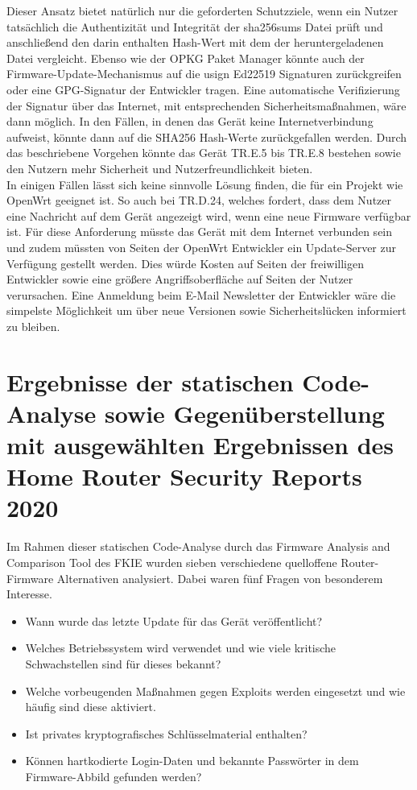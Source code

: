 \documentclass[a4paper]{book}
\begin{document}
\begin{large}
\begin{onehalfspace}
\noindent Dieser Ansatz bietet natürlich nur die geforderten Schutzziele, wenn ein Nutzer tatsächlich die Authentizität und Integrität der sha256sums Datei prüft und anschließend den darin enthalten Hash-Wert mit dem der heruntergeladenen Datei vergleicht. Ebenso wie der OPKG Paket Manager könnte auch der Firmware-Update-Mechanismus auf die usign Ed22519 \mbox Signaturen zurückgreifen oder eine GPG-Signatur der Entwickler tragen. Eine automatische Verifizierung der Signatur über das Internet, mit entsprechenden Sicherheitsmaßnahmen, wäre dann möglich. In den Fällen, in denen das Gerät keine Internetverbindung aufweist, könnte dann auf die SHA256 Hash-Werte zurückgefallen werden. Durch das beschriebene Vorgehen könnte das Gerät TR.E.5 bis TR.E.8 bestehen sowie den Nutzern mehr Sicherheit und Nutzerfreundlichkeit bieten. 	\\ \indent
	In einigen Fällen lässt sich keine sinnvolle Lösung finden, die für ein Projekt wie OpenWrt geeignet ist. So auch bei TR.D.24, welches fordert, dass dem Nutzer eine Nachricht auf dem Gerät angezeigt wird, wenn eine neue Firmware verfügbar ist. Für diese Anforderung müsste das Gerät mit dem Internet verbunden sein und zudem müssten von Seiten der OpenWrt Entwickler ein Update-Server zur Verfügung gestellt werden. Dies würde Kosten auf Seiten der freiwilligen Entwickler sowie eine größere Angriffsoberfläche auf Seiten der Nutzer verursachen. Eine Anmeldung beim E-Mail Newsletter der Entwickler wäre die simpelste Möglichkeit um über neue Versionen sowie Sicherheitslücken informiert zu bleiben. 

\end{onehalfspace}



\section[Ergebnisse und Gegenüberstellung]{Ergebnisse der statischen Code-Analyse sowie Gegenüberstellung mit ausgewählten Ergebnissen des Home Router Security Reports 2020}
\label{erg_statisch}
\begin{onehalfspace}
Im Rahmen dieser statischen Code-Analyse durch das \glqq Firmware Analysis and Comparison Tool \grqq{} des FKIE wurden sieben verschiedene quelloffene Router-Firmware Alternativen analysiert. Dabei waren fünf Fragen von besonderem Interesse. 

\begin{itemize}
\item Wann wurde das letzte Update für das Gerät veröffentlicht?
\item Welches Betriebssystem wird verwendet und wie viele kritische Schwachstellen sind für dieses bekannt?
\item Welche vorbeugenden Maßnahmen gegen Exploits werden eingesetzt und wie häufig sind diese aktiviert.
\item Ist privates kryptografisches Schlüsselmaterial enthalten?
\item Können hartkodierte Login-Daten und bekannte Passwörter in dem Firmware-Abbild gefunden werden?
\end{itemize}


\end{onehalfspace}
\end{large}
\end{document}
